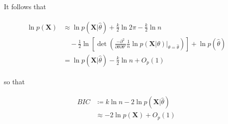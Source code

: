 \documentclass[11pt]{article}
\begin{document}
It follows that

\begin{align}
\begin{split}
\ln{p(\mathbf{X})} & \approx \ln{p(\mathbf{X} \vert \hat{\theta})} + \frac{k}{2}\ln{2\pi} - \frac{k}{2}\ln{n} \\
& \quad - \frac{1}{2}\ln{\left[\det{\left(\frac{-\partial^2}{\partial\theta\partial\theta'}\frac{1}{n}\ln{p(\mathbf{X} \vert \theta)} \vert_{\theta=\hat{\theta}}\right)}\right]} + \ln{p(\hat{\theta})} \\
&= \ln{p(\mathbf{X} \vert \hat{\theta})} - \frac{k}{2}\ln{n} + O_p(1)
\end{split}
\end{align}

so that

\begin{align}
\begin{split}
BIC & \coloneqq k\ln{n} - 2\ln{p(\mathbf{X} \vert \hat{\theta})} \\
& \approx -2\ln{p(\mathbf{X})} + O_p(1)
\end{split}
\end{align}

\end{document}
